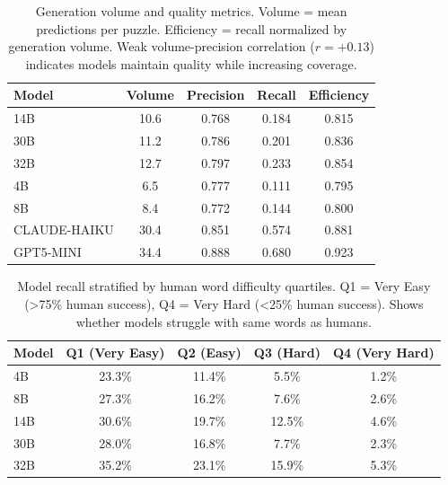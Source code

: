 
\begin{table}[t]
\centering
\small
\caption{Generation volume and quality metrics. Volume = mean predictions per puzzle. Efficiency = recall normalized by generation volume. Weak volume-precision correlation ($r=+0.13$) indicates models maintain quality while increasing coverage.}
\label{tab:volume_analysis}
\begin{tabular}{lcccc}
\toprule
\textbf{Model} & \textbf{Volume} & \textbf{Precision} & \textbf{Recall} & \textbf{Efficiency} \\
\midrule
14B & 10.6 & 0.768 & 0.184 & 0.815 \\
30B & 11.2 & 0.786 & 0.201 & 0.836 \\
32B & 12.7 & 0.797 & 0.233 & 0.854 \\
4B  & 6.5 & 0.777 & 0.111 & 0.795 \\
8B  & 8.4 & 0.772 & 0.144 & 0.800 \\
CLAUDE-HAIKU & 30.4 & 0.851 & 0.574 & 0.881 \\
GPT5-MINI & 34.4 & 0.888 & 0.680 & 0.923 \\
\bottomrule
\end{tabular}
\end{table}




\begin{table}[t]
\centering
\small
\caption{Model recall stratified by human word difficulty quartiles. Q1 = Very Easy (>75\% human success), Q4 = Very Hard (<25\% human success). Shows whether models struggle with same words as humans.}
\label{tab:word_difficulty_strat}
\begin{tabular}{lcccc}
\toprule
\textbf{Model} & \textbf{Q1 (Very Easy)} & \textbf{Q2 (Easy)} & \textbf{Q3 (Hard)} & \textbf{Q4 (Very Hard)} \\
\midrule
4B  & 23.3\% & 11.4\% & 5.5\% & 1.2\% \\
8B  & 27.3\% & 16.2\% & 7.6\% & 2.6\% \\
14B & 30.6\% & 19.7\% & 12.5\% & 4.6\% \\
30B & 28.0\% & 16.8\% & 7.7\% & 2.3\% \\
32B & 35.2\% & 23.1\% & 15.9\% & 5.3\% \\
\bottomrule
\end{tabular}
\end{table}



